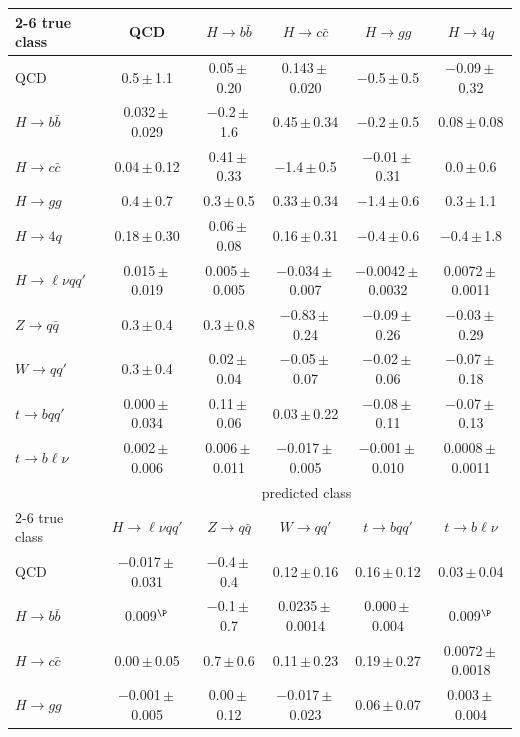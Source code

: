 \begin{landscape}
{\begin{center}
\begin{minipage}{\linewidth}
\begin{tabular*}{\linewidth}{@{\extracolsep{\fill}}lccccc@{}}
\cmidrule(lr){2-6}
true class & QCD & $H\to b\bar b$ & $H\to c\bar c$ & $H\to gg$ & $H\to 4q$ \\
\midrule
QCD & 0.5\,$\pm$\,1.1 & 0.05\,$\pm$\,0.20 & 0.143\,$\pm$\,0.020 & $-$0.5\,$\pm$\,0.5 & $-$0.09\,$\pm$\,0.32 \\
$H\to b\bar b$ & 0.032\,$\pm$\,0.029 & $-$0.2\,$\pm$\,1.6 & 0.45\,$\pm$\,0.34 & $-$0.2\,$\pm$\,0.5 & 0.08\,$\pm$\,0.08 \\
$H\to c\bar c$ & 0.04\,$\pm$\,0.12 & 0.41\,$\pm$\,0.33 & $-$1.4\,$\pm$\,0.5 & $-$0.01\,$\pm$\,0.31 & 0.0\,$\pm$\,0.6 \\
$H\to gg$ & 0.4\,$\pm$\,0.7 & 0.3\,$\pm$\,0.5 & 0.33\,$\pm$\,0.34 & $-$1.4\,$\pm$\,0.6 & 0.3\,$\pm$\,1.1 \\
$H\to 4q$ & 0.18\,$\pm$\,0.30 & 0.06\,$\pm$\,0.08 & 0.16\,$\pm$\,0.31 & $-$0.4\,$\pm$\,0.6 & $-$0.4\,$\pm$\,1.8 \\
$H\to \ell\nu qq'$ & 0.015\,$\pm$\,0.019 & 0.005\,$\pm$\,0.005 & $-$0.034\,$\pm$\,0.007 & $-$0.0042\,$\pm$\,0.0032 & 0.0072\,$\pm$\,0.0011 \\
$Z\to q\bar q$ & 0.3\,$\pm$\,0.4 & 0.3\,$\pm$\,0.8 & $-$0.83\,$\pm$\,0.24 & $-$0.09\,$\pm$\,0.26 & $-$0.03\,$\pm$\,0.29 \\
$W\to qq'$ & 0.3\,$\pm$\,0.4 & 0.02\,$\pm$\,0.04 & $-$0.05\,$\pm$\,0.07 & $-$0.02\,$\pm$\,0.06 & $-$0.07\,$\pm$\,0.18 \\
$t\to bqq'$ & 0.000\,$\pm$\,0.034 & 0.11\,$\pm$\,0.06 & 0.03\,$\pm$\,0.22 & $-$0.08\,$\pm$\,0.11 & $-$0.07\,$\pm$\,0.13 \\
$t\to b\ell\nu$ & 0.002\,$\pm$\,0.006 & 0.006\,$\pm$\,0.011 & $-$0.017\,$\pm$\,0.005 & $-$0.001\,$\pm$\,0.010 & 0.0008\,$\pm$\,0.0011 \\
\midrule
 & \multicolumn{5}{c}{predicted class} \\
\cmidrule(lr){2-6}
true class & $H\to \ell\nu qq'$ & $Z\to q\bar q$ & $W\to qq'$ & $t\to bqq'$ & $t\to b\ell\nu$ \\
\midrule
QCD & $-$0.017\,$\pm$\,0.031 & $-$0.4\,$\pm$\,0.4 & 0.12\,$\pm$\,0.16 & 0.16\,$\pm$\,0.12 & 0.03\,$\pm$\,0.04 \\
$H\to b\bar b$ & 0.009$^{\P}$ & $-$0.1\,$\pm$\,0.7 & 0.0235\,$\pm$\,0.0014 & 0.000\,$\pm$\,0.004 & 0.009$^{\P}$ \\
$H\to c\bar c$ & 0.00\,$\pm$\,0.05 & 0.7\,$\pm$\,0.6 & 0.11\,$\pm$\,0.23 & 0.19\,$\pm$\,0.27 & 0.0072\,$\pm$\,0.0018 \\
$H\to gg$ & $-$0.001\,$\pm$\,0.005 & 0.00\,$\pm$\,0.12 & $-$0.017\,$\pm$\,0.023 & 0.06\,$\pm$\,0.07 & 0.003\,$\pm$\,0.004 \\

\end{tabular*}
\end{minipage}
\end{center}}
\end{landscape}
